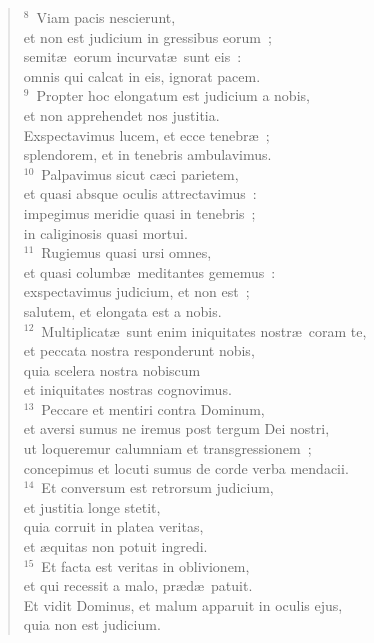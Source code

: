 \begin{flushleft}
\begin{verse}
${}^{8}$~Viam pacis nescierunt,\\ et non est judicium in gressibus eorum~;\\ semit\ae\ eorum incurvat\ae\ sunt eis~:\\ omnis qui calcat in eis, ignorat pacem.\\
${}^{9}$~Propter hoc elongatum est judicium a nobis,\\ et non apprehendet nos justitia.\\ Exspectavimus lucem, et ecce tenebr\ae~;\\ splendorem, et in tenebris ambulavimus.\\
${}^{10}$~Palpavimus sicut c\ae ci parietem,\\ et quasi absque oculis attrectavimus~:\\ impegimus meridie quasi in tenebris~;\\ in caliginosis quasi mortui.\\
${}^{11}$~Rugiemus quasi ursi omnes,\\ et quasi columb\ae\ meditantes gememus~:\\ exspectavimus judicium, et non est~;\\ salutem, et elongata est a nobis.\\
${}^{12}$~Multiplicat\ae\ sunt enim iniquitates nostr\ae\ coram te,\\ et peccata nostra responderunt nobis,\\ quia scelera nostra nobiscum\\ et iniquitates nostras cognovimus.\\
${}^{13}$~Peccare et mentiri contra Dominum,\\ et aversi sumus ne iremus post tergum Dei nostri,\\ ut loqueremur calumniam et transgressionem~;\\ concepimus et locuti sumus de corde verba mendacii.\\
${}^{14}$~Et conversum est retrorsum judicium,\\ et justitia longe stetit,\\ quia corruit in platea veritas,\\ et \ae quitas non potuit ingredi.\\
${}^{15}$~Et facta est veritas in oblivionem,\\ et qui recessit a malo, pr\ae d\ae\ patuit.\\ Et vidit Dominus, et malum apparuit in oculis ejus,\\ quia non est judicium.\\

\end{verse}
\end{flushleft}
